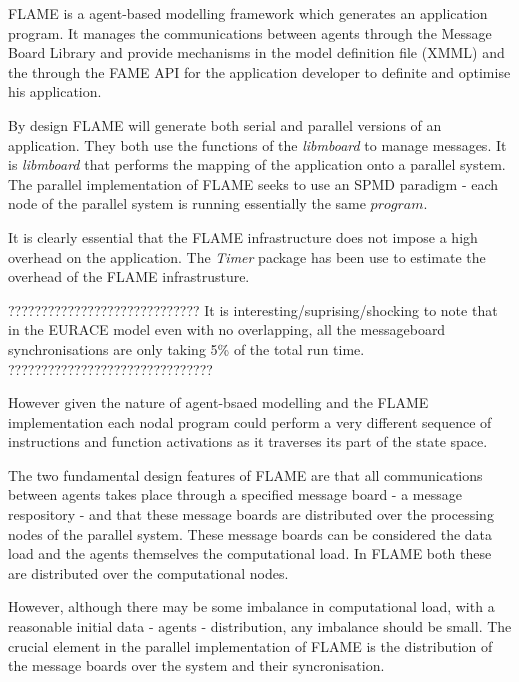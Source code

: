 FLAME is a agent-based modelling framework which generates an application program. It manages the communications between agents through the Message Board Library and provide mechanisms in the model definition file (XMML) and the through the FAME API for the application developer to definite and optimise his application.

By design FLAME will generate both serial and parallel versions of an application. They both use the functions of the \textit{libmboard} to manage messages. It is \textit{libmboard} that performs the mapping of the application onto a parallel system. The parallel implementation of FLAME seeks to use an SPMD paradigm - each node of the parallel system is running essentially the same $program$. 

It is clearly essential that the FLAME infrastructure does not impose a high overhead on the application. The \textit{Timer} package has been use to estimate the overhead of the FLAME infrastrusture. 

\par
?????????????????????????????
It is interesting/suprising/shocking to note that in the EURACE model even with no overlapping, all the messageboard synchronisations are only taking 5\% of the total run time.
???????????????????????????????
\par
However given the nature of agent-bsaed modelling and the FLAME implementation each nodal program could perform a very different sequence of instructions and function activations as it traverses its part of the state space. 

The two fundamental design features of FLAME are that all communications between agents takes place through a specified message board - a message respository - and that these message boards are distributed over the processing nodes of the parallel system. These message boards can be considered the data load and the agents themselves the computational load. In FLAME both these are distributed over the computational nodes.

However, although there may be some imbalance in computational load, with a reasonable initial data - agents - distribution, any imbalance should be small. The crucial element in the parallel implementation of FLAME is the distribution of the message boards over the system and their syncronisation.

